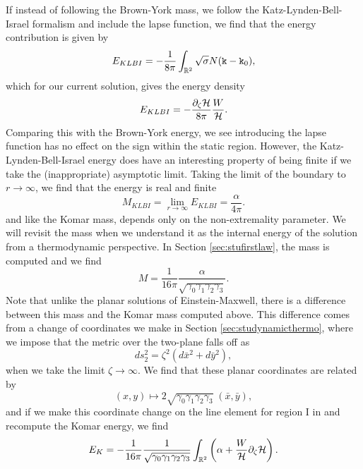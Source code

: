 If instead of following the Brown-York mass, we follow the Katz-Lynden-Bell-Israel formalism and include the lapse function, we find that the energy contribution is given by
\begin{equation*}
E_{KLBI} = -\frac{1}{8 \pi} \int_{{\mathbb{R}}^2} \sqrt{\sigma} N (\mathtt{k} - \mathtt{k}_0),
\end{equation*}
which for our current solution, gives the energy density
\begin{equation}
E_{KLBI} = - \frac{\partial_{\zeta} {\cal H}}{8 \pi} \frac{W}{{\cal H}} .
\end{equation}
Comparing this with the Brown-York energy, we see introducing the lapse function has no effect on the sign within the static region. However, the Katz-Lynden-Bell-Israel energy does have an interesting property of being finite if we take the (inappropriate) asymptotic limit. Taking the limit of the boundary to $r \rightarrow \infty$, we find that the energy is real and finite
\begin{equation*}
	M_{KLBI} = \lim_{r \rightarrow \infty} E_{KLBI} = \frac{\alpha}{4 \pi}.
\end{equation*}
and like the Komar mass, depends only on the non-extremality parameter. We will revisit the mass when we understand it as the internal energy of the solution from a thermodynamic perspective. In Section \ref{sec:stufirstlaw}, the mass is computed and we find
\begin{equation*}
	M = \frac{1}{16\pi} \frac{\alpha}{\sqrt{\gamma_0 \gamma_1 \gamma_2 \gamma_3}}.
\end{equation*}
Note that unlike the planar solutions of Einstein-Maxwell, there is a difference between this mass and the Komar mass computed above. This difference comes from a change of coordinates we make in Section \ref{sec:studynamicthermo}, where we impose that the metric over the two-plane falls off as 
\begin{equation*}
	ds^2_2 = \zeta^2 (d\bar{x}^2 + d\bar{y}^2),
\end{equation*}
when we take the limit $\zeta \to \infty$. We find that these planar coordinates are related by 
\begin{equation*}
	(x, y) \mapsto 2 \sqrt{\gamma_0 \gamma_1 \gamma_2 \gamma_3} \; (\bar{x}, \bar{y}),
\end{equation*}
and if we make this coordinate change on the line element for region I in  and recompute the Komar energy, we find
\begin{equation*}
        E_K = -\frac{1}{16\pi} \frac{1}{\sqrt{\gamma_0 \gamma_1 \gamma_2 \gamma_3}} \int_{{\mathbb{R}}^2} \left(\alpha + \frac{W}{{\cal H}} \partial_{\zeta} {\cal H} \right) .
\end{equation*}
